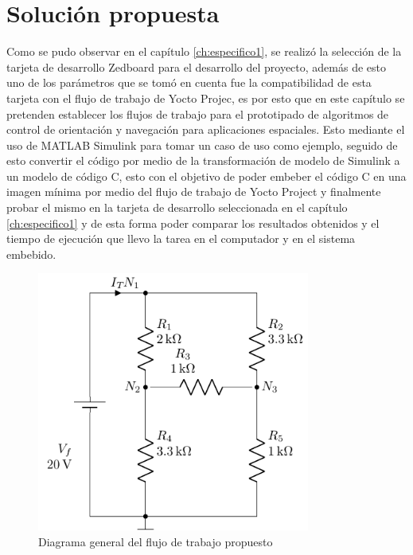 \chapter{Solución propuesta}
\label{ch:especifico2}

Como se pudo observar en el capítulo \ref{ch:especifico1}, se realizó la selección de la tarjeta de desarrollo Zedboard para el desarrollo del proyecto, además de esto uno de los parámetros que se tomó en cuenta fue la compatibilidad de esta tarjeta con el flujo de trabajo de Yocto Projec, es por esto que en este capítulo se pretenden establecer los flujos de trabajo para el prototipado de algoritmos de control de orientación y navegación para aplicaciones espaciales. Esto mediante el uso de MATLAB Simulink para tomar un caso de uso como ejemplo, seguido de esto convertir el código por medio de la transformación de modelo de Simulink a un modelo de código C, esto con el objetivo de poder embeber el código C en una imagen mínima por medio del flujo de trabajo de Yocto Project y finalmente probar el mismo en la tarjeta de desarrollo seleccionada en el capítulo \ref{ch:especifico1} y de esta forma poder comparar los resultados obtenidos y el tiempo de ejecución que llevo la tarea en el computador y en el sistema embebido.


\begin{figure}[h!]
    \centering
    \includegraphics[width=0.8\textwidth]{fig/figtemplate.pdf}
    \caption{Diagrama general del flujo de trabajo propuesto}
    \label{fig:diagrama_flujo_trabajo}
\end{figure}


